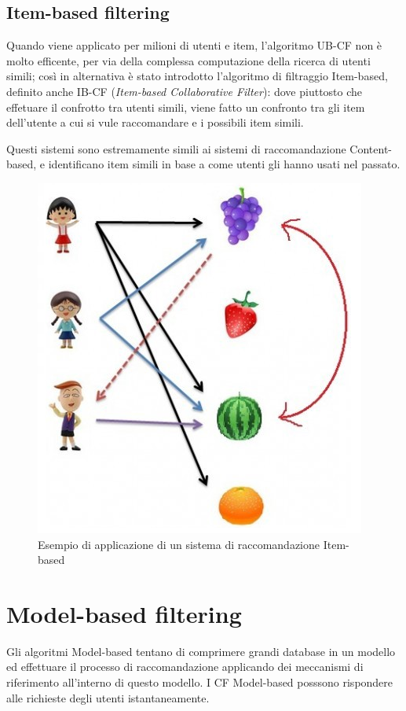 \subsection{Item-based filtering} \hfill \break


Quando viene applicato per milioni di utenti e item, l'algoritmo UB-CF non è molto efficente, per via della complessa computazione della 
ricerca di utenti simili; così in alternativa è stato introdotto l'algoritmo di filtraggio Item-based, definito anche IB-CF 
(\textit{Item-based Collaborative Filter}): dove piuttosto che effetuare il confrotto tra utenti simili, viene fatto un confronto tra 
gli item dell'utente a cui si vule raccomandare e i possibili item simili.

Questi sistemi sono estremamente simili ai sistemi di raccomandazione Content-based, e identificano item simili in base a come utenti gli
hanno usati nel passato.


\cite{item-based-collaborative-filtering}

\begin{figure}[ht!]
	\centering
	\includegraphics[scale=0.5]{images/IB_CF_ex.PNG}
	\caption{Esempio di applicazione di un sistema di raccomandazione Item-based}
	\label{fig:IB_CF}
\end{figure}

\section{Model-based filtering}
Gli algoritmi Model-based tentano di comprimere grandi database in un modello ed effettuare il processo di raccomandazione applicando dei
meccanismi di riferimento all'interno di questo modello. I CF Model-based posssono rispondere alle richieste degli utenti istantaneamente.
\cite{model-based-approach-for-collaborative-filtering}